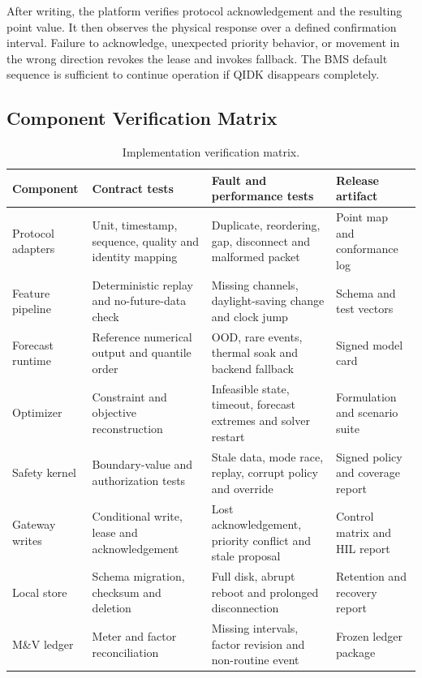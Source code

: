 After writing, the platform verifies protocol acknowledgement and the resulting point value. It then observes the physical response over a defined confirmation interval. Failure to acknowledge, unexpected priority behavior, or movement in the wrong direction revokes the lease and invokes fallback. The BMS default sequence is sufficient to continue operation if QIDK disappears completely.

\subsection{Component Verification Matrix}

\begin{table}[t]
	\centering
	\caption{Implementation verification matrix.}
	\label{tab:verification}
	\begin{tabularx}{\textwidth}{p{}p{}X p{}}
		\toprule
		Component         & Contract tests                                          & Fault and performance tests                                     & Release artifact                  \\
		\midrule
		Protocol adapters & Unit, timestamp, sequence, quality and identity mapping & Duplicate, reordering, gap, disconnect and malformed packet     & Point map and conformance log     \\
		Feature pipeline  & Deterministic replay and no-future-data check           & Missing channels, daylight-saving change and clock jump         & Schema and test vectors           \\
		Forecast runtime  & Reference numerical output and quantile order           & OOD, rare events, thermal soak and backend fallback             & Signed model card                 \\
		Optimizer         & Constraint and objective reconstruction                 & Infeasible state, timeout, forecast extremes and solver restart & Formulation and scenario suite    \\
		Safety kernel     & Boundary-value and authorization tests                  & Stale data, mode race, replay, corrupt policy and override      & Signed policy and coverage report \\
		Gateway writes    & Conditional write, lease and acknowledgement            & Lost acknowledgement, priority conflict and stale proposal      & Control matrix and HIL report     \\
		Local store       & Schema migration, checksum and deletion                 & Full disk, abrupt reboot and prolonged disconnection            & Retention and recovery report     \\
		M\&V ledger       & Meter and factor reconciliation                         & Missing intervals, factor revision and non-routine event        & Frozen ledger package             \\
		\bottomrule
	\end{tabularx}
\end{table}

